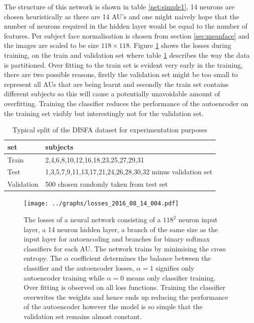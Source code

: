     The structure of this network is shown in table \ref{net:simple1}, 14 neurons
    are chosen heuristically as there are 14 AU's and one might naively hope that the number of
    neurons required in the hidden layer would be equal to the number of features. Per subject face normalisation
    is chosen from section \ref{sec:meanface} and the images are scaled to be size $118 \times 118$.
    Figure \ref{fig:simple} shows the losses during training, on the train and validation set where table \ref{tab:splitting}
    describes the way the data is partitioned. Over fitting to the train set is evident very early in the training, there are two
    possible reasons, firstly the validation set might be too small to represent all AUs that are being learnt and secondly the train
    set contains different subjects so this will cause a potentially unavoidable amount of overfitting.
    Training the classifier reduces the performance of the autoencoder on the
    training set visibly but interestingly not for the validation set.

    \begin{table}[h!]
      \centering
      {\footnotesize
      \begin{tabular}{|l|l|}
      \hline
      set & subjects   \\
      \hline
       Train          & 2,4,6,8,10,12,16,18,23,25,27,29,31      \\
      \hline
      Test      & 1,3,5,7,9,11,13,17,21,24,26,28,30,32 minus validation set     \\
      \hline
      Validation           & 500 chosen randomly taken from test set      \\
     \hline
      \end{tabular}
      \caption{Typical split of the DISFA dataset for experimentation purposes}
      \label{tab:splitting}  }
    \end{table}


    \begin{figure}[!h]
    \centering
    \texttt{[image: ../graphs/losses\_2016\_08\_14\_004.pdf]}
    \caption{The losses of a neural network consisting of a $118^2$ neuron input layer, a 14
    neuron hidden layer, a branch of the same size as the input layer for autoencoding
    and branches for binary softmax classifiers for each AU. The network trains by minimising
    the cross entropy. The $\alpha$ coefficient determines the balance between the
    classifier and the autoencoder losses, $\alpha=1$ signifies only autoencoder training
    while $\alpha=0$ means only classifier training. Over fitting is observed
    on all loss functions. Training the classifier
    overwrites the weights and hence ends up reducing
    the performance of the autoencoder however the
    model is so simple that the validation set remains almost constant.}
    \label{fig:simple}
    \end{figure}

